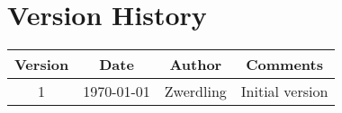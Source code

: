 \section{Version History}
\begin{adjustbox}{width=\textwidth}
  \begin{tabular}{ |c|c|c|c| }
    \hline
    Version & Date   & Author      & Comments          \\
    \hline
    \hline
    1       & \today & {Zwerdling} & {Initial version} \\
    \hline
  \end{tabular}
\end{adjustbox}
